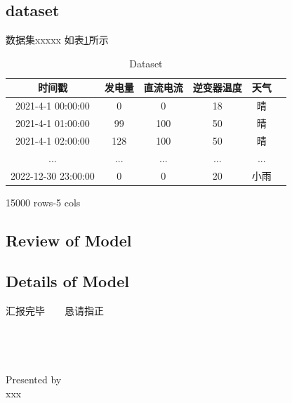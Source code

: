 \documentclass{ctexbeamer}
\begin{document}
\subsection{dataset}
\begin{frame}{数据集}{xxxxx}
如表\ref{tab1}所示
\begin{table}
\centering
\caption{Dataset}
\label{tab1}
\begin{tabular}{cccccc}
\toprule
时间戳 & 发电量 & 直流电流 & 逆变器温度 & 天气  \\
\midrule
2021-4-1 00:00:00 & 0 & 0 & 18 & 晴   \\
2021-4-1 01:00:00 & 99 & 100 & 50 & 晴  \\
2021-4-1 02:00:00 & 128 & 100 & 50 & 晴 \\
...               & ... & ... & ... & ... \\
2022-12-30 23:00:00 & 0 & 0 & 20 & 小雨 \\
\bottomrule
\end{tabular}
\end{table}
15000 rows-5 cols
\end{frame}

\subsection{Review of Model}

\subsection{Details of Model}




\begin{frame}
    \begin{center}
        汇报完毕~~~~恳请指正
        ~\\
        ~\\
        ~\\
        ~\\
        ~\\
        Presented by
        ~\\
        xxx
    \end{center}
\end{frame}
\end{document}
